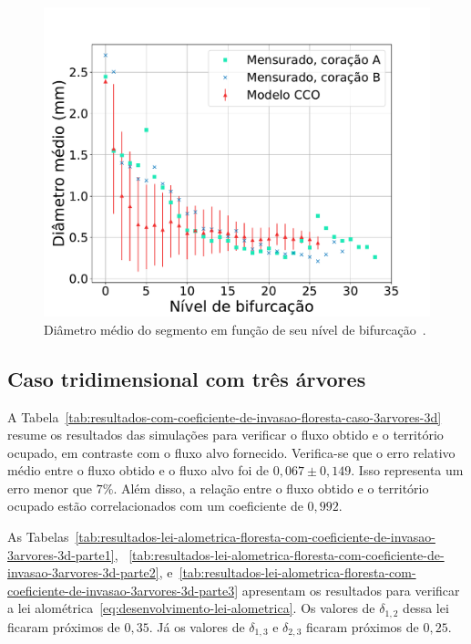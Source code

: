 \begin{figure}[!htb]
  \centering
  \captiondelim{: }
  \caption{Diâmetro médio do segmento em função de seu nível de bifurcação~\cite{Zamir1987}.}
  
  \includegraphics[scale=0.35]{figuras/modelos-computacionais-de-arvores-circulatorias/diametro-medio-zamir.pdf}
  
  \label{fig:morfometria-floresta-zamir}
\end{figure}

\clearpage

\subsection{Caso tridimensional com três árvores}\label{sec:floresta-com-invasao-caso-3arvores-3d}


A Tabela~\ref{tab:resultados-com-coeficiente-de-invasao-floresta-caso-3arvores-3d} resume os resultados
das simulações para verificar o fluxo obtido e o território ocupado, em contraste com o 
fluxo alvo fornecido.
Verifica-se que o erro relativo médio entre o fluxo obtido e o fluxo alvo foi 
de $0,067 \pm 0,149$. Isso representa um erro menor que $7\%$. 
Além disso, a relação entre o fluxo obtido e o território ocupado estão correlacionados com um
coeficiente de $0,992$.


As Tabelas~\ref{tab:resultados-lei-alometrica-floresta-com-coeficiente-de-invasao-3arvores-3d-parte1}, 
~\ref{tab:resultados-lei-alometrica-floresta-com-coeficiente-de-invasao-3arvores-3d-parte2}, 
e~\ref{tab:resultados-lei-alometrica-floresta-com-coeficiente-de-invasao-3arvores-3d-parte3} apresentam os resultados 
para verificar a lei alométrica~\eqref{eq:desenvolvimento-lei-alometrica}. Os valores
de $\delta_{1, 2}$ dessa lei ficaram próximos de $0,35$. 
Já os valores de $\delta_{1, 3}$ e $\delta_{2, 3}$ ficaram próximos de $0,25$.

